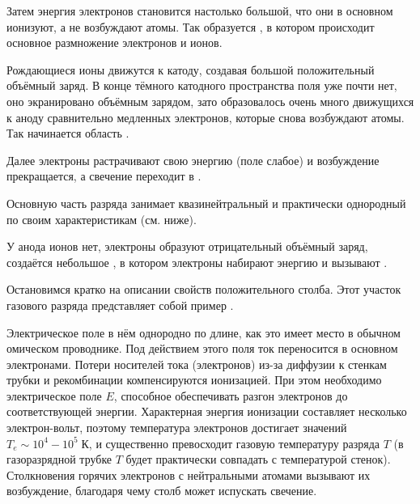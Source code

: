 Затем энергия электронов становится настолько
большой, что они в основном ионизуют, а не возбуждают атомы. Так образуется
, в котором происходит
основное размножение электронов и ионов.

Рождающиеся ионы движутся к катоду,
создавая большой положительный объёмный заряд. В конце тёмного
катодного пространства поля уже почти нет, оно экранировано объёмным зарядом,
зато образовалось очень много движущихся к аноду сравнительно медленных
электронов, которые снова возбуждают атомы. Так
начинается область .

Далее электроны растрачивают свою энергию (поле слабое) и возбуждение прекращается,
а свечение переходит в .

Основную часть разряда занимает квазинейтральный и практически однородный
по своим характеристикам  (см. ниже).

У анода ионов нет, электроны образуют отрицательный объёмный заряд,
создаётся небольшое , в котором электроны
набирают энергию и вызывают .

Остановимся кратко на описании свойств положительного столба.
Этот участок газового разряда представляет собой пример
.

Электрическое поле в нём однородно по длине,
как это имеет место в обычном омическом проводнике.
Под действием этого поля ток переносится в основном электронами.
Потери носителей тока (электронов) из-за диффузии к стенкам трубки и рекомбинации
компенсируются ионизацией. При этом необходимо электрическое поле $E$,
способное обеспечивать разгон электронов до соответствующей энергии.
Характерная энергия ионизации составляет несколько электрон-вольт,
поэтому температура электронов достигает значений $T_e \sim 10^4 - 10^5\;К$,
и существенно превосходит газовую температуру разряда $T$ (в газоразрядной трубке
$T$ будет практически совпадать с температурой стенок).
Столкновения горячих электронов с нейтральными атомами вызывают их возбуждение,
благодаря чему столб может испускать свечение.

